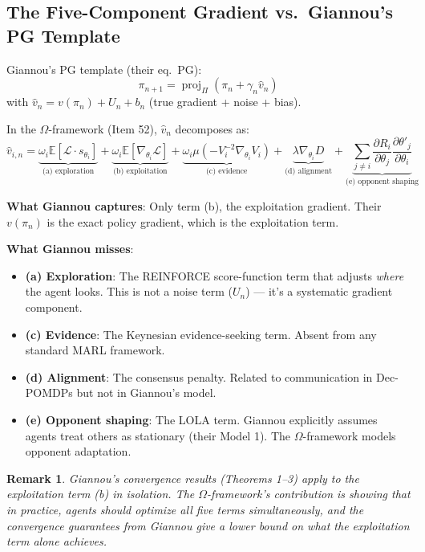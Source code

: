 \documentclass[11pt,a4paper]{article}
\newtheorem{remark}[theorem]{Remark}
\DeclareMathOperator{\proj}{proj}
\newcommand{\E}{\mathbb{E}}
\newcommand{\calL}{\mathcal{L}}
\begin{document}
\subsection{The Five-Component Gradient vs.\ Giannou's PG Template}

Giannou's PG template (their eq.\ PG):
\[
\pi_{n+1} = \proj_\Pi(\pi_n + \gamma_n \hat{v}_n)
\]
with $\hat{v}_n = v(\pi_n) + U_n + b_n$ (true gradient + noise + bias).

In the $\Omega$-framework (Item 52), $\hat{v}_n$ decomposes as:
\begin{equation}
\hat{v}_{i,n} = \underbrace{\omega_i \E[\calL \cdot s_{\theta_i}]}_{\text{(a) exploration}} + \underbrace{\omega_i \E[\nabla_{\theta_i} \calL]}_{\text{(b) exploitation}} + \underbrace{\omega_i \mu(-V_i^{-2}\nabla_{\theta_i} V_i)}_{\text{(c) evidence}} + \underbrace{\lambda \nabla_{\theta_i} D}_{\text{(d) alignment}} + \underbrace{\sum_{j \neq i} \frac{\partial R_i}{\partial \theta_j}\frac{\partial \theta'_j}{\partial \theta_i}}_{\text{(e) opponent shaping}}
\label{eq:five-component}
\end{equation}

\textbf{What Giannou captures}: Only term (b), the exploitation gradient. Their $v(\pi_n)$ is the exact policy gradient, which is the exploitation term.

\textbf{What Giannou misses}:
\begin{itemize}[nosep]
\item \textbf{(a) Exploration}: The REINFORCE score-function term that adjusts \emph{where} the agent looks. This is not a noise term ($U_n$) — it's a systematic gradient component.
\item \textbf{(c) Evidence}: The Keynesian evidence-seeking term. Absent from any standard MARL framework.
\item \textbf{(d) Alignment}: The consensus penalty. Related to communication in Dec-POMDPs but not in Giannou's model.
\item \textbf{(e) Opponent shaping}: The LOLA term. Giannou explicitly assumes agents treat others as stationary (their Model 1). The $\Omega$-framework models opponent adaptation.
\end{itemize}

\begin{remark}
Giannou's convergence results (Theorems 1--3) apply to the exploitation term (b) in isolation. The $\Omega$-framework's contribution is showing that in practice, agents should optimize \emph{all five terms simultaneously}, and the convergence guarantees from Giannou give a lower bound on what the exploitation term alone achieves.
\end{remark}
\end{document}
